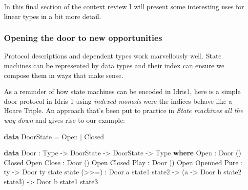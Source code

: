 \documentclass[
]{article}
\newenvironment{Shaded}{}{}
\newcommand{\DataTypeTok}[1]{\textcolor[rgb]{0.56,0.13,0.00}{#1}}
\newcommand{\KeywordTok}[1]{\textcolor[rgb]{0.00,0.44,0.13}{\textbf{#1}}}
\newcommand{\NormalTok}[1]{#1}
\newcommand{\OperatorTok}[1]{\textcolor[rgb]{0.40,0.40,0.40}{#1}}
\newcommand{\OtherTok}[1]{\textcolor[rgb]{0.00,0.44,0.13}{#1}}
\begin{document}
In this final section of the context review I will present some
interesting uses for linear types in a bit more detail.

\hypertarget{opening-the-door-to-new-opportunities}{%
\subsubsection{Opening the door to new
opportunities}\label{opening-the-door-to-new-opportunities}}

Protocol descriptions and dependent types work marvellously well. State
machines can be represented by data types and their index can ensure we
compose them in ways that make sense.

As a reminder of how state machines can be encoded in Idris1, here is a
simple door protocol in Idris 1 using \emph{indexed monads}
\cite{parameterised_computation} were the indices behave like a Hoare
Triple. An approach that's been put to practice in \emph{State machines
all the way down}\cite{state_machines} and gives rise to our example:

\begin{Shaded}
\begin{Highlighting}[]
\KeywordTok{data} \DataTypeTok{DoorState} \OtherTok{=} \DataTypeTok{Open} \OperatorTok{|} \DataTypeTok{Closed}

\KeywordTok{data} \DataTypeTok{Door} \OperatorTok{:} \DataTypeTok{Type} \OtherTok{{-}\textgreater{}} \DataTypeTok{DoorState} \OtherTok{{-}\textgreater{}} \DataTypeTok{DoorState} \OtherTok{{-}\textgreater{}} \DataTypeTok{Type} \KeywordTok{where} 
    \DataTypeTok{Open} \OperatorTok{:} \DataTypeTok{Door}\NormalTok{ () }\DataTypeTok{Closed} \DataTypeTok{Open}
    \DataTypeTok{Close} \OperatorTok{:} \DataTypeTok{Door}\NormalTok{ () }\DataTypeTok{Open} \DataTypeTok{Closed}
    \DataTypeTok{Play} \OperatorTok{:} \DataTypeTok{Door}\NormalTok{ () }\DataTypeTok{Open} \DataTypeTok{Openned}
    \DataTypeTok{Pure} \OperatorTok{:}\NormalTok{ ty }\OtherTok{{-}\textgreater{}} \DataTypeTok{Door}\NormalTok{ ty state state}
\NormalTok{    (}\OperatorTok{\textgreater{}\textgreater{}=}\NormalTok{) }\OperatorTok{:} \DataTypeTok{Door}\NormalTok{ a state1 state2 }\OtherTok{{-}\textgreater{}}
\NormalTok{             (a }\OtherTok{{-}\textgreater{}} \DataTypeTok{Door}\NormalTok{ b state2 state3) }\OtherTok{{-}\textgreater{}}
             \DataTypeTok{Door}\NormalTok{ b state1 state3}
\end{Highlighting}
\end{Shaded}
\end{document}
